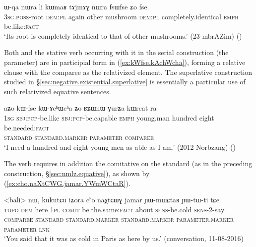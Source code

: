 \begin{exe} 
	\ex \label{ex:fsWfse.Zo.fse}
	\gll ɯ-qa nɯra li kɯmaʁ tɤjmɤɣ nɯra fsɯfse ʑo fse. \\
	\textsc{3sg}.\textsc{poss}-root \textsc{dem}:\textsc{pl} again other mushroom \textsc{dem}:\textsc{pl} completely.identical \textsc{emph} be.like:\textsc{fact} \\
	\glt `Its root is completely identical to that of other mushrooms.' (23-mbrAZim)
()
\end{exe}


Both  and the stative verb occurring with it in the serial construction (the parameter) are in participial form in (\ref{ex:kWfse.kAchWcha}), forming a relative clause with the comparee as the relativized element. The superlative construction studied in §\ref{sec:negative.existential.superlative} is essentially a particular use of such relativized equative sentences.

\begin{exe}
\ex \label{ex:kWfse.kAchWcha}
\glll aʑo kɯ-fse kɯ-ɤcʰɯcʰa ʑo ʁʑɯnɯ ɣurʑa kɯrcat ra\\
\textsc{1sg} \textsc{sbj}:\textsc{pcp}-be.like \textsc{sbj}:\textsc{pcp}-be.capable \textsc{emph} young.man hundred eight be.needed:\textsc{fact} \\
\textsc{standard} \textsc{standard}.\textsc{marker} \textsc{parameter} { } \textsc{comparee} \\
\glt `I need a hundred and eight young men as able as I am.' (2012 Norbzang)
()
\end{exe}

The verb  requires in addition the comitative  on the standard (as in the preceding construction, §\ref{sec:nmlz.equative}), as shown by (\ref{ex:cho.naXtCWG.jamar.YWmWCtaR}).

\begin{exe}
\ex \label{ex:cho.naXtCWG.jamar.YWmWCtaR}
\glll <bali> nɯ, kukutɕu iʑora cʰo naχtɕɯɣ jamar ɲɯ-mɯɕtaʁ ɲɯ-tɯ-ti tɕe \\
\textsc{topo} \textsc{dem} here \textsc{1pl} \textsc{comit} be.the.same:\textsc{fact} about \textsc{sens}-be.cold \textsc{sens}-2-say \\
\textsc{comparee} { }  \textsc{standard} \textsc{standard}.\textsc{marker} \textsc{standard}.\textsc{marker}  \textsc{parameter}.\textsc{marker} \textsc{parameter} \textsc{lnk} \\
\glt `You said that it was as cold in Paris as here by us.' (conversation, 11-08-2016)
\end{exe}




